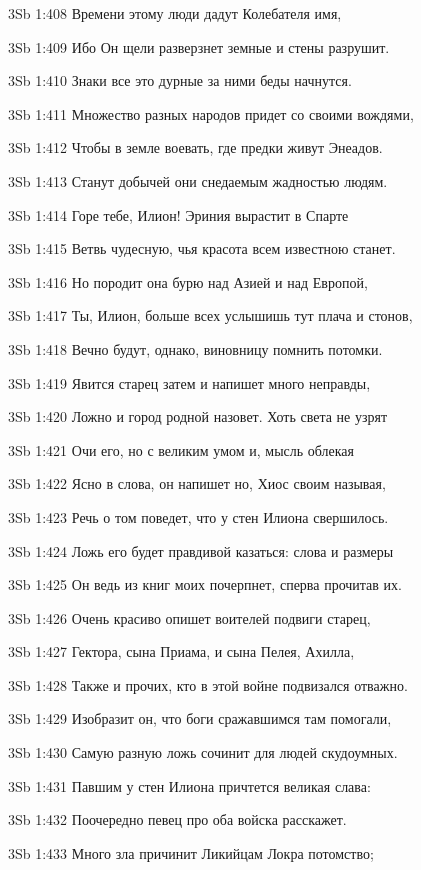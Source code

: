 \vs 3Sb 1:408 Времени этому люди дадут Колебателя имя, 

\vs 3Sb 1:409 Ибо Он щели разверзнет земные и стены разрушит.

\vs 3Sb 1:410 Знаки все это дурные  за ними беды начнутся.

\vs 3Sb 1:411 Множество разных народов придет со своими вождями, 

\vs 3Sb 1:412 Чтобы в земле воевать, где предки живут Энеадов. 

\vs 3Sb 1:413 Станут добычей они снедаемым жадностью людям.

\vs 3Sb 1:414 Горе тебе, Илион! Эриния вырастит в Спарте

\vs 3Sb 1:415 Ветвь чудесную, чья красота всем известною станет. 

\vs 3Sb 1:416 Но породит она бурю над Азией и над Европой, 

\vs 3Sb 1:417 Ты, Илион, больше всех услышишь тут плача и стонов, 

\vs 3Sb 1:418 Вечно будут, однако, виновницу помнить потомки.

\vs 3Sb 1:419 Явится старец затем и напишет много неправды, 

\vs 3Sb 1:420 Ложно и город родной назовет. Хоть света не узрят 

\vs 3Sb 1:421 Очи его, но с великим умом и, мысль облекая 

\vs 3Sb 1:422 Ясно в слова, он напишет  но, Хиос своим называя, 

\vs 3Sb 1:423 Речь о том поведет, что у стен Илиона свершилось. 

\vs 3Sb 1:424 Ложь его будет правдивой казаться: слова и размеры 

\vs 3Sb 1:425 Он ведь из книг моих почерпнет, сперва прочитав их.

\vs 3Sb 1:426 Очень красиво опишет воителей подвиги старец,

\vs 3Sb 1:427 Гектора, сына Приама, и сына Пелея, Ахилла,

\vs 3Sb 1:428 Также и прочих, кто в этой войне подвизался отважно.

\vs 3Sb 1:429 Изобразит он, что боги сражавшимся там помогали, 

\vs 3Sb 1:430 Самую разную ложь сочинит для людей скудоумных.

\vs 3Sb 1:431 Павшим у стен Илиона причтется великая слава:

\vs 3Sb 1:432 Поочередно певец про оба войска расскажет.

\vs 3Sb 1:433 Много зла причинит Ликийцам Локра потомство;

